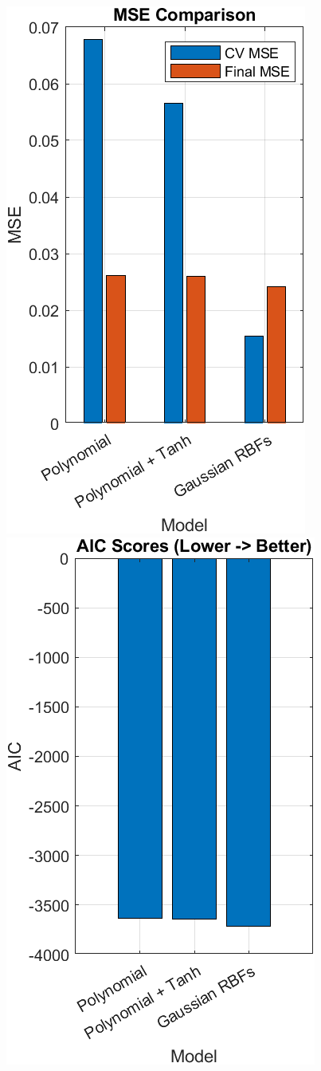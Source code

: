 \documentclass[12pt]{article} %
\numberwithin{equation}{section}  %
\begin{document}
\begin{figure}[ht!]
    \centering
    \begin{minipage}{0.49\textwidth}
        \centering
        \includegraphics[width=0.5\linewidth]{plots/plotB_6_mse.png}
    \end{minipage}
    \hfill
    \begin{minipage}{0.49\textwidth}
        \centering
        \includegraphics[width=0.5\linewidth]{plots/plotB_7_aic.png}
    \end{minipage}

    \caption{}
    \label{fig:measures}
\end{figure}
\end{document}
